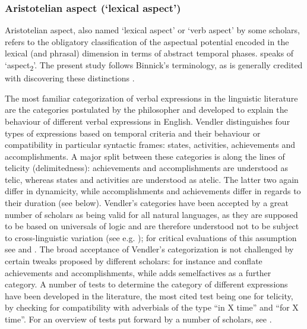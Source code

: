 \subsubsection{Aristotelian aspect (\lq lexical aspect')}\label{AristotelianAspect}
Aristotelian aspect, also named \lq lexical aspect' or \lq verb aspect' by some scholars, refers to the obligatory classification of the aspectual potential encoded in the lexical (and phrasal) dimension in terms of abstract temporal phases. \citet{SasseHJ2002} speaks of \lq aspect\textsubscript{2}'. The present study follows Binnick's terminology, as  is generally credited with discovering these distinctions \citep[171f]{BinnickR1991}.

The most familiar categorization of verbal expressions in the linguistic literature are the categories postulated by the philosopher \citet{VendlerZ1957} and developed to explain the behaviour of different verbal expressions in English. Vendler distinguishes four types of expressions based on temporal criteria and their behaviour or compatibility in particular syntactic frames: states, activities, achievements and accomplishments. A major split between these categories is along the lines of telicity (delimitedness): achievements and accomplishments are understood as telic, whereas states and activities are understood as atelic. The latter two again differ in dynamicity, while accomplishments and achievements differ in regards to their duration (see below). Vendler's categories have been accepted by a great number of scholars as being valid for all natural languages, as they are supposed to be based on universals of logic and are therefore understood not to be subject to cross-linguistic variation (see e.g. \citealt[322]{TatevosovS2002}); for critical evaluations of this assumption see \citet{FilipH2011} and \citet{Bar-elL2015}. The broad acceptance of Vendler's categorization is not challenged by certain tweaks proposed by different scholars: for instance \citet{VerkuylH1972} and \citet{KennyA1969} conflate achievements and accomplishments, while \citet{SmithC1997} adds semelfactives as a further category. A number of tests to determine the category of different expressions have been developed in the literature, the most cited test being one for telicity, by checking for compatibility with adverbials of the type ``in X time'' and ``for X time''. For an overview of tests put forward by a number of scholars, see \citet[173–197]{BinnickR1991}.

